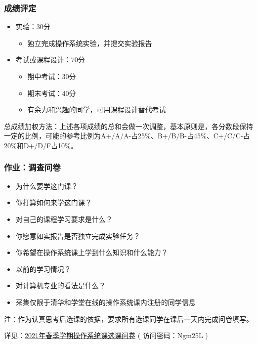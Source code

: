 \begin{frame}[fragile]
    \frametitle{成绩评定}
    \begin{itemize}
        \item 实验：30分
        \begin{itemize}
            \item 独立完成操作系统实验，并提交实验报告
        \end{itemize} %
        \item 考试或课程设计：70分
        \begin{itemize}
            \item 期中考试：30分
            \item 期末考试：40分
            \item 有余力和兴趣的同学，可用课程设计替代考试
        \end{itemize}

    \end{itemize} %

    总成绩加权方法：上述各项成绩的总和会做一次调整，基本原则是，各分数段保持一定的比例，可能的参考比例为A+/A/A-占25\%、B+/B/B-占45\%、C+/C/C-占20\%和D+/D/F占10\%。 

\end{frame}

    
    \begin{frame}
        \frametitle{作业：调查问卷}
        \begin{itemize}
            \item 为什么要学这门课？ %
            \item 你打算如何来学这门课？
            \item 对自己的课程学习要求是什么？
            \item 你愿意如实报告是否独立完成实验任务？
            \item 你希望在操作系统课上学到什么知识和什么能力？ %
            \item 以前的学习情况？
            \item 对计算机专业的看法是什么？ %
            \item 采集仅限于清华和学堂在线的操作系统课内注册的同学信息
        \end{itemize}
        
    \newline
    \newline
    
    注：作为认真思考后选课的依据，要求所有选课同学在课后一天内完成问卷填写。
    
    详见：\href{http://oscourse2019.mikecrm.com/te8s1h2}{2021年春季学期操作系统课选课问卷} ( 访问密码：Ngm25L )
    
    \end{frame}


